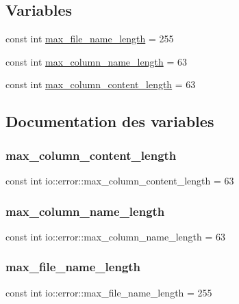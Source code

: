 \subsection*{Variables}
\begin{DoxyCompactItemize}
\item 
const int \hyperlink{namespaceio_1_1error_ac757e93a049ae7a5f23e522933de68e4}{max\+\_\+file\+\_\+name\+\_\+length} = 255
\item 
const int \hyperlink{namespaceio_1_1error_ae17181bae477fe72ddad096b6b1d6963}{max\+\_\+column\+\_\+name\+\_\+length} = 63
\item 
const int \hyperlink{namespaceio_1_1error_a5a641f4f0837f4c94416e05461a62749}{max\+\_\+column\+\_\+content\+\_\+length} = 63
\end{DoxyCompactItemize}


\subsection{Documentation des variables}
\mbox{\label{namespaceio_1_1error_a5a641f4f0837f4c94416e05461a62749}} 
\subsubsection{\texorpdfstring{max\+\_\+column\+\_\+content\+\_\+length}{max\_column\_content\_length}}
{\footnotesize\ttfamily const int io\+::error\+::max\+\_\+column\+\_\+content\+\_\+length = 63}

\mbox{\label{namespaceio_1_1error_ae17181bae477fe72ddad096b6b1d6963}} 
\subsubsection{\texorpdfstring{max\+\_\+column\+\_\+name\+\_\+length}{max\_column\_name\_length}}
{\footnotesize\ttfamily const int io\+::error\+::max\+\_\+column\+\_\+name\+\_\+length = 63}

\mbox{\label{namespaceio_1_1error_ac757e93a049ae7a5f23e522933de68e4}} 
\subsubsection{\texorpdfstring{max\+\_\+file\+\_\+name\+\_\+length}{max\_file\_name\_length}}
{\footnotesize\ttfamily const int io\+::error\+::max\+\_\+file\+\_\+name\+\_\+length = 255}


